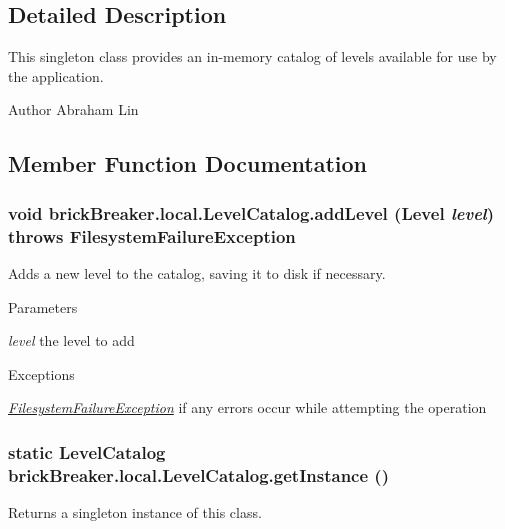 \subsection{Detailed Description}
This singleton class provides an in-\/memory catalog of levels available for use by the application.

\begin{DoxyAuthor}{Author}
Abraham Lin 
\end{DoxyAuthor}


\subsection{Member Function Documentation}
\hypertarget{classbrick_breaker_1_1local_1_1_level_catalog_a81201df02f319ba10645c3ee711cb777}{
\subsubsection[{addLevel}]{\setlength{\rightskip}{0pt plus 5cm}void brickBreaker.local.LevelCatalog.addLevel ({\bf Level} {\em level})  throws {\bf FilesystemFailureException} }}
\label{classbrick_breaker_1_1local_1_1_level_catalog_a81201df02f319ba10645c3ee711cb777}
Adds a new level to the catalog, saving it to disk if necessary.


\begin{DoxyParams}{Parameters}
\item[{\em level}]the level to add\end{DoxyParams}

\begin{DoxyExceptions}{Exceptions}
\item[{\em \hyperlink{classbrick_breaker_1_1local_1_1_filesystem_failure_exception}{FilesystemFailureException}}]if any errors occur while attempting the operation \end{DoxyExceptions}
\hypertarget{classbrick_breaker_1_1local_1_1_level_catalog_abeb4b9d17e6743896f3f02eeaa571a42}{
\subsubsection[{getInstance}]{\setlength{\rightskip}{0pt plus 5cm}static {\bf LevelCatalog} brickBreaker.local.LevelCatalog.getInstance ()}}
\label{classbrick_breaker_1_1local_1_1_level_catalog_abeb4b9d17e6743896f3f02eeaa571a42}
Returns a singleton instance of this class.

